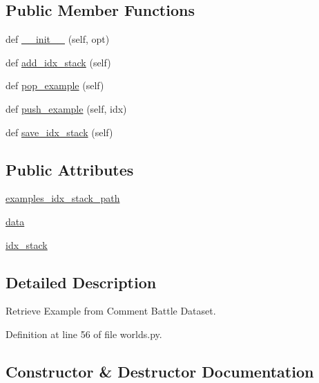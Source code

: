 \subsection*{Public Member Functions}
\begin{DoxyCompactItemize}
\item 
def \hyperlink{classigc__evals_1_1worlds_1_1IGCExampleGenerator_a44d9772a080f6ec923cdd13392a47f5e}{\+\_\+\+\_\+init\+\_\+\+\_\+} (self, opt)
\item 
def \hyperlink{classigc__evals_1_1worlds_1_1IGCExampleGenerator_aa0801aa3a53c7fd57a759c2080936174}{add\+\_\+idx\+\_\+stack} (self)
\item 
def \hyperlink{classigc__evals_1_1worlds_1_1IGCExampleGenerator_a68420b6b80ae5d3a8825302359371ed5}{pop\+\_\+example} (self)
\item 
def \hyperlink{classigc__evals_1_1worlds_1_1IGCExampleGenerator_a34dc6ef46a9ba8a1c72c8b674ff444b9}{push\+\_\+example} (self, idx)
\item 
def \hyperlink{classigc__evals_1_1worlds_1_1IGCExampleGenerator_a3f787da040d9b83d9c857b8ef65d36eb}{save\+\_\+idx\+\_\+stack} (self)
\end{DoxyCompactItemize}
\subsection*{Public Attributes}
\begin{DoxyCompactItemize}
\item 
\hyperlink{classigc__evals_1_1worlds_1_1IGCExampleGenerator_aa309ee59a607d747c0f9868951ecba0a}{examples\+\_\+idx\+\_\+stack\+\_\+path}
\item 
\hyperlink{classigc__evals_1_1worlds_1_1IGCExampleGenerator_ab21dfe02e8b60d4e37e25b8d942c4b61}{data}
\item 
\hyperlink{classigc__evals_1_1worlds_1_1IGCExampleGenerator_ac091cb764c64196d922d65d030f6ec57}{idx\+\_\+stack}
\end{DoxyCompactItemize}


\subsection{Detailed Description}
\begin{DoxyVerb}Retrieve Example from Comment Battle Dataset.
\end{DoxyVerb}
 

Definition at line 56 of file worlds.\+py.



\subsection{Constructor \& Destructor Documentation}
\mbox{\label{classigc__evals_1_1worlds_1_1IGCExampleGenerator_a44d9772a080f6ec923cdd13392a47f5e}} 
